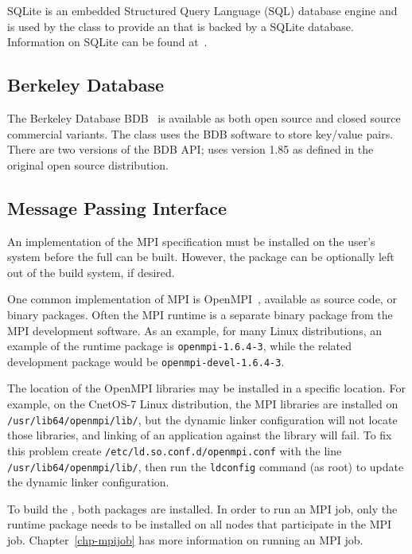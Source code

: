 SQLite is an embedded Structured Query Language (SQL) database engine and is
used by the  class to provide an
 that is backed by a SQLite database. Information
on SQLite can be found at~\cite{sqlite}.

\subsection{Berkeley Database}

The Berkeley Database {BDB}~\cite{berkeleydb} is available as both open source
and closed source commercial variants. The \sname class
 uses the BDB software to store key/value pairs.
There are two versions of the BDB API; \sname uses version 1.85 as defined in
the original open source distribution.

\subsection{Message Passing Interface}

An implementation of the MPI specification must be installed on the user's
system before the full \sname can be built. However, the  package
can be optionally left out of the \sname build system, if desired.

One common implementation of MPI is OpenMPI~\cite{openmpi}, available as source
code, or binary packages. Often the MPI runtime is a separate binary package
from the MPI development software. As an example, for many Linux distributions,
an example of the runtime package is \texttt{openmpi-1.6.4-3}, while
the related development package would be \texttt{openmpi-devel-1.6.4-3}.

The location of the OpenMPI libraries may be installed in a specific location.
For example, on the CnetOS-7 Linux distribution, the MPI libraries are installed
on {\tt /usr/lib64/openmpi/lib/}, but the dynamic linker configuration will
not locate those libraries, and linking of an application against the \sname
library will fail. To fix this problem create
{\tt /etc/ld.so.conf.d/openmpi.conf} with the line
{\tt /usr/lib64/openmpi/lib/}, then run the {\tt ldconfig} command (as root)
to update the dynamic linker configuration.

To build the \sname, both packages are installed. In order to run an MPI
job, only the runtime package needs to be installed on all nodes that
participate in the MPI job. Chapter~\ref{chp-mpijob} has more information on
running an MPI job.
